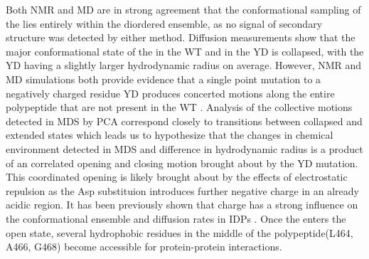 Both NMR and MD are in strong agreement that the conformational sampling of the \gct lies entirely within the diordered ensemble, as no signal of secondary structure was detected by either method. Diffusion measurements show that the major conformational state of the \gct in the WT and in the YD is collapsed, with the YD having a slightly larger hydrodynamic radius on average. However, NMR and MD simulations both provide evidence that a single point mutation to a negatively charged residue YD produces concerted motions along the entire polypeptide that are not present in the WT \gct. Analysis of the collective motions detected in MDS by PCA correspond closely to transitions between collapsed and extended states which leads us to hypothesize that the changes in chemical environment detected in MDS and difference in hydrodynamic radius is a product of an correlated opening and closing motion brought about by the YD mutation. This coordinated opening is likely brought about by the effects of electrostatic repulsion as the Asp substituion introduces further negative charge in an already acidic region. It has been previously shown that charge has a strong influence on the conformational ensemble and diffusion rates in IDPs \cite{mao2010net}. Once the \gct enters the open state, several hydrophobic residues in the middle of the polypeptide(L464, A466, G468) become accessible for protein-protein interactions.


